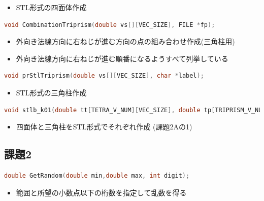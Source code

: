 \documentclass[a4paper,10pt]{jsarticle}
\begin{document}
\begin{itemize}
 \item STL形式の四面体作成
\end{itemize}

\begin{lstlisting}[basicstyle=\ttfamily\footnotesize, language=C, frame=single, numbers=none, breaklines=true]
void CombinationTriprism(double vs[][VEC_SIZE], FILE *fp);
\end{lstlisting}

\begin{itemize}
 \item 外向き法線方向に右ねじが進む方向の点の組み合わせ作成(三角柱用)
 \item 外向き法線方向に右ねじが進む順番になるようすべて列挙している
\end{itemize}

\begin{lstlisting}[basicstyle=\ttfamily\footnotesize, language=C, frame=single, numbers=none, breaklines=true]
void prStlTriprism(double vs[][VEC_SIZE], char *label);
\end{lstlisting}

\begin{itemize}
 \item STL形式の三角柱作成
\end{itemize}

\begin{lstlisting}[basicstyle=\ttfamily\footnotesize, language=C, frame=single, numbers=none, breaklines=true]
void stlb_k01(double tt[TETRA_V_NUM][VEC_SIZE], double tp[TRIPRISM_V_NUM][VEC_SIZE]);
\end{lstlisting}

\begin{itemize}
 \item 四面体と三角柱をSTL形式でそれぞれ作成 (課題2Aの1)
\end{itemize}

\subsection{課題2}

\begin{lstlisting}[basicstyle=\ttfamily\footnotesize, language=C, frame=single, numbers=none, breaklines=true]
double GetRandom(double min,double max, int digit);
\end{lstlisting}

\begin{itemize}
 \item 範囲と所望の小数点以下の桁数を指定して乱数を得る
\end{itemize}
\end{document}
